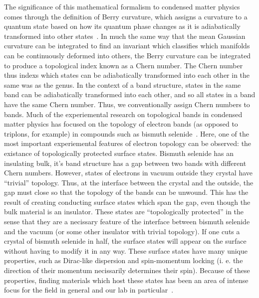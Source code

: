 \documentclass{thesis-umich}
\begin{document}
The significance of this mathematical formalism to condensed matter physics comes through the definition of Berry curvature, which assigns a curvature to a quantum state based on how its quantum phase changes as it is  adiabatically transformed into other states~\cite{Berry1984}. In much the same way that the mean Gaussian curvature can be integrated to find an invariant which classifies which manifolds can be continuously deformed into others, the Berry curvature can be integrated to produce a topological index known as a Chern number. The Chern number thus indexs which states can be adiabatically transformed into each other in the same was as the genus. In the context of a band structure, states in the same band can be adiabatically transformed into each other, and so all states in a band have the same Chern number. Thus, we conventionally assign Chern numbers to bands. Much of the experiemental research on topological bands in condensed matter physics has focused on the topology of electron bands (as opposed to triplons, for example) in compounds such as bismuth selenide~\cite{Hsieh2008}. Here, one of the most important experiemental features of electron topology can be observed: the existance of topologically protected surface states. Bismuth selenide has an insulating bulk, it's band structure has a gap between two bands with different Chern numbers. However, states of electrons in vacuum outside they crystal have ``trivial'' topology. Thus, at the interface between the crystal and the outside, the gap must close so that the topology of the bands can be unwound. This has the result of creating conducting surface states which span the gap, even though the bulk material is an insulator. These states are ``topologically protected'' in the sense that they are a necissary feature of the interface between bismuth selenide and the vacuum (or some other insulator with trivial topology). If one cuts a crystal of bismuth selenide in half, the surface states will appear on the surface without having to modify it in any way. These surface states have many unique properties, such as Dirac-like dispersion and spin-momentum locking (i. e. the direction of their momentum necissarily determines their spin)\cite{Fu2007}. Because of these properties, finding materials which host these states has been an area of intense focus for the field in general and our lab in particular~\cite{Li2014}.
\end{document}
